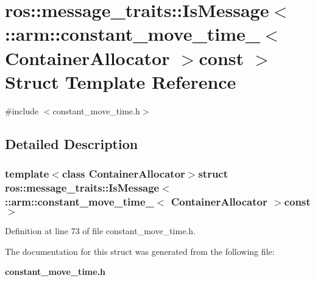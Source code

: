 \section{ros\-:\-:message\-\_\-traits\-:\-:\-Is\-Message$<$ \-:\-:arm\-:\-:constant\-\_\-move\-\_\-time\-\_\-$<$ \-Container\-Allocator $>$const $>$ \-Struct \-Template \-Reference}
\label{structros_1_1message__traits_1_1IsMessage_3_01_1_1arm_1_1constant__move__time___3_01ContainerAllocator_01_4const_01_01_4}


{\ttfamily \#include $<$constant\-\_\-move\-\_\-time.\-h$>$}



\subsection{\-Detailed \-Description}
\subsubsection*{template$<$class Container\-Allocator$>$struct ros\-::message\-\_\-traits\-::\-Is\-Message$<$ \-::arm\-::constant\-\_\-move\-\_\-time\-\_\-$<$ Container\-Allocator $>$const  $>$}



\-Definition at line 73 of file constant\-\_\-move\-\_\-time.\-h.



\-The documentation for this struct was generated from the following file\-:\begin{DoxyCompactItemize}
\item 
{\bf constant\-\_\-move\-\_\-time.\-h}\end{DoxyCompactItemize}
